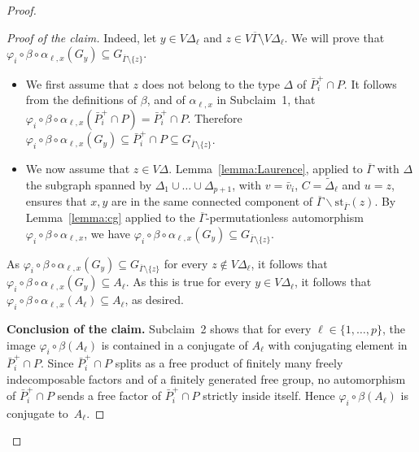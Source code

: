 \documentclass[a4paper,english,11pt]{article}
\theoremstyle{definition}
\theoremstyle{remark}
\newcommand{\st}{\mathrm{st}}
\begin{document}
\begin{proof}
\begin{proof}[Proof of the claim]
    Indeed, let $y\in V\Delta_\ell$ and $z\in V\overline\Gamma\setminus V\Delta_\ell$. We will prove that $\varphi_i\circ\beta\circ\alpha_{\ell,x}(G_y)\subseteq G_{\overline\Gamma\setminus\{z\}}$. 
    \begin{itemize}
    \item We first assume that $z$ does not belong to the type $\Delta$ of $\bar P_i^+\cap P$. It follows from the definitions of $\beta$, and of $\alpha_{\ell,x}$ in Subclaim~1, that $\varphi_i\circ\beta\circ\alpha_{\ell,x}(\bar P_i^+\cap P)=\bar P_i^+\cap P$. Therefore $\varphi_i\circ\beta\circ\alpha_{\ell,x}(G_y)\subseteq \bar P_i^+\cap P\subseteq G_{\overline\Gamma\setminus\{z\}}$. 
    \item We now assume that $z\in V\Delta$. Lemma~\ref{lemma:Laurence}, applied to $\overline{\Gamma}$ with $\Delta$ the subgraph spanned by $\Delta_1\cup\dots\cup\Delta_{p+1}$,
    with $v=\bar{v}_i$, $C=\tilde\Delta_\ell$ and $u=z$, ensures that $x,y$ are in the same connected component of $\overline\Gamma\backslash \st_{\overline{\Gamma}}(z)$.
    By Lemma~\ref{lemma:cg} applied to the $\overline{\Gamma}$-permutationless automorphism $\varphi_i\circ\beta\circ\alpha_{\ell,x}$, we have $\varphi_i\circ\beta\circ\alpha_{\ell,x}(G_y)\subseteq G_{\overline\Gamma\setminus\{z\}}$.
    \end{itemize}
    As $\varphi_i\circ\beta\circ\alpha_{\ell,x}(G_y)\subseteq G_{\overline\Gamma\setminus\{z\}}$ for every $z\notin V\Delta_\ell$, it follows that $\varphi_i\circ\beta\circ\alpha_{\ell,x}(G_y)\subseteq A_\ell$. As this is true for every $y\in V\Delta_\ell$, it follows that $\varphi_i\circ\beta\circ\alpha_{\ell,x}(A_\ell)\subseteq A_\ell$, as desired.
    
    \medskip
    
    \textbf{Conclusion of the claim.} Subclaim~2 shows that for every $\ell\in\{1,\dots,p\}$, the image $\varphi_i\circ\beta(A_\ell)$ is contained in a conjugate of $A_\ell$ with conjugating element in $\bar P_i^+\cap P$. Since $\bar P_i^+\cap P$ splits as a free product of finitely many freely indecomposable factors and of a finitely generated free group, no automorphism of $\bar P_i^+\cap P$ sends a free factor of $\bar P_i^+\cap P$ strictly inside itself. Hence $\varphi_i\circ\beta(A_\ell)$ is conjugate to~$A_\ell$. 
\end{proof}


\end{proof}
\end{document}
